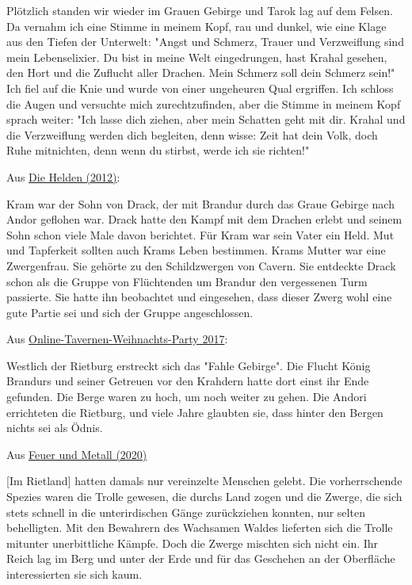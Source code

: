 \documentclass[10pt, a4paper, oneside]{book}
\newcommand{\refstorytext}[1]{\hyperref[Storytext: #1]{#1}}
\begin{document}
\begin{multicols}{2}
Plötzlich standen wir wieder im Grauen Gebirge und Tarok lag auf dem Felsen. Da vernahm ich eine Stimme in meinem Kopf, rau und dunkel, wie eine Klage aus den Tiefen der Unterwelt: "Angst und Schmerz, Trauer und Verzweiflung sind mein Lebenselixier. Du bist in meine Welt eingedrungen, hast Krahal gesehen, den Hort und die Zuflucht aller Drachen. Mein Schmerz soll dein Schmerz sein!" Ich fiel auf die Knie und wurde von einer ungeheuren Qual ergriffen. Ich schloss die Augen und versuchte mich zurechtzufinden, aber die Stimme in meinem Kopf sprach weiter: "Ich lasse dich ziehen, aber mein Schatten geht mit dir. Krahal und die Verzweiflung werden dich begleiten, denn wisse: Zeit hat dein Volk, doch Ruhe mitnichten, denn wenn du stirbst, werde ich sie richten!"

\begin{center}
    Aus \refstorytext{Die Helden (2012)}:
\end{center}

Kram war der Sohn von Drack, der mit Brandur durch das Graue Gebirge nach Andor geflohen war. Drack hatte den Kampf mit dem Drachen erlebt und seinem Sohn schon viele Male davon berichtet. Für Kram war sein Vater ein Held. Mut und Tapferkeit sollten auch Krams Leben bestimmen. Krams Mutter war eine Zwergenfrau. Sie gehörte zu den Schildzwergen von Cavern. Sie entdeckte Drack schon als die Gruppe von Flüchtenden um Brandur den vergessenen Turm passierte. Sie hatte ihn beobachtet und eingesehen, dass dieser Zwerg wohl eine gute Partie sei und sich der Gruppe angeschlossen.

\begin{center}
    Aus \refstorytext{Online-Tavernen-Weihnachts-Party 2017}:
\end{center}

Westlich der Rietburg erstreckt sich das "Fahle Gebirge". Die Flucht König Brandurs und seiner Getreuen vor den Krahdern hatte dort einst ihr Ende gefunden. Die Berge waren zu hoch, um noch weiter zu gehen. Die Andori errichteten die Rietburg, und viele Jahre glaubten sie, dass hinter den Bergen nichts sei als Ödnis.

\begin{center}
    Aus \refstorytext{Feuer und Metall (2020)}
\end{center}

[Im Rietland] hatten damals nur vereinzelte Menschen gelebt. Die vorherrschende Spezies waren die Trolle gewesen, die durchs Land zogen und die Zwerge, die sich stets schnell in die unterirdischen Gänge zurückziehen konnten, nur selten behelligten. Mit den Bewahrern des Wachsamen Waldes lieferten sich die Trolle mitunter unerbittliche Kämpfe. Doch die Zwerge mischten sich nicht ein. Ihr Reich lag im Berg und unter der Erde und für das Geschehen an der Oberfläche interessierten sie sich kaum.\bigskip


\end{multicols}
\end{document}
